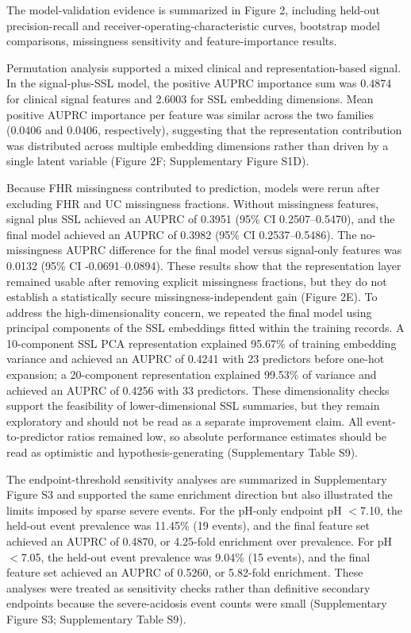 \documentclass[utf8]{FrontiersinHarvard}
\begin{document}
The model-validation evidence is summarized in Figure 2, including held-out precision-recall and receiver-operating-characteristic curves, bootstrap model comparisons, missingness sensitivity and feature-importance results.

Permutation analysis supported a mixed clinical and representation-based signal. In the signal-plus-SSL model, the positive AUPRC importance sum was 0.4874 for clinical signal features and 2.6003 for SSL embedding dimensions. Mean positive AUPRC importance per feature was similar across the two families (0.0406 and 0.0406, respectively), suggesting that the representation contribution was distributed across multiple embedding dimensions rather than driven by a single latent variable (Figure 2F; Supplementary Figure S1D).

Because FHR missingness contributed to prediction, models were rerun after excluding FHR and UC missingness fractions. Without missingness features, signal plus SSL achieved an AUPRC of 0.3951 (95\% CI 0.2507--0.5470), and the final model achieved an AUPRC of 0.3982 (95\% CI 0.2537--0.5486). The no-missingness AUPRC difference for the final model versus signal-only features was 0.0132 (95\% CI -0.0691--0.0894). These results show that the representation layer remained usable after removing explicit missingness fractions, but they do not establish a statistically secure missingness-independent gain (Figure 2E). To address the high-dimensionality concern, we repeated the final model using principal components of the SSL embeddings fitted within the training records. A 10-component SSL PCA representation explained 95.67\% of training embedding variance and achieved an AUPRC of 0.4241 with 23 predictors before one-hot expansion; a 20-component representation explained 99.53\% of variance and achieved an AUPRC of 0.4256 with 33 predictors. These dimensionality checks support the feasibility of lower-dimensional SSL summaries, but they remain exploratory and should not be read as a separate improvement claim. All event-to-predictor ratios remained low, so absolute performance estimates should be read as optimistic and hypothesis-generating (Supplementary Table S9).

The endpoint-threshold sensitivity analyses are summarized in Supplementary Figure S3 and supported the same enrichment direction but also illustrated the limits imposed by sparse severe events. For the pH-only endpoint pH $<$7.10, the held-out event prevalence was 11.45\% (19 events), and the final feature set achieved an AUPRC of 0.4870, or 4.25-fold enrichment over prevalence. For pH $<$7.05, the held-out event prevalence was 9.04\% (15 events), and the final feature set achieved an AUPRC of 0.5260, or 5.82-fold enrichment. These analyses were treated as sensitivity checks rather than definitive secondary endpoints because the severe-acidosis event counts were small (Supplementary Figure S3; Supplementary Table S9).
\end{document}
